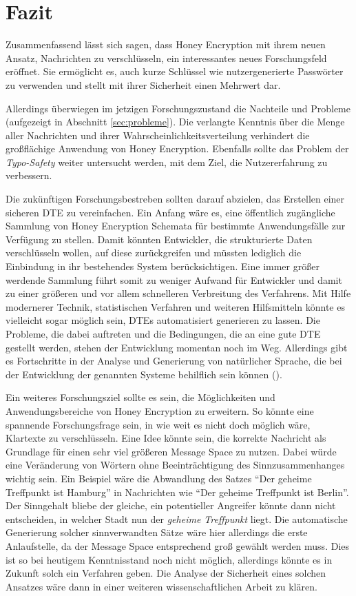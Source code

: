 \section{Fazit}
\label{sec:fazit}
Zusammenfassend lässt sich sagen, dass Honey Encryption mit ihrem neuen Ansatz, Nachrichten zu verschlüsseln, ein interessantes neues Forschungsfeld eröffnet. Sie ermöglicht es, auch kurze Schlüssel wie nutzergenerierte Passwörter zu verwenden und stellt mit ihrer Sicherheit einen Mehrwert dar.

Allerdings überwiegen im jetzigen Forschungszustand die Nachteile und Probleme (aufgezeigt in Abschnitt \ref{sec:probleme}). Die verlangte Kenntnis über die Menge aller Nachrichten und ihrer Wahrscheinlichkeitsverteilung verhindert die großflächige Anwendung von Honey Encryption. Ebenfalls sollte das Problem der \emph{Typo-Safety} weiter untersucht werden, mit dem Ziel, die Nutzererfahrung zu verbessern.

Die zukünftigen Forschungsbestreben sollten darauf abzielen, das Erstellen einer sicheren DTE zu vereinfachen. Ein Anfang wäre es, eine öffentlich zugängliche Sammlung von Honey Encryption Schemata für bestimmte Anwendungsfälle zur Verfügung zu stellen. Damit könnten Entwickler, die strukturierte Daten verschlüsseln wollen, auf diese zurückgreifen und müssten lediglich die Einbindung in ihr bestehendes System berücksichtigen. Eine immer größer werdende Sammlung führt somit zu weniger Aufwand für Entwickler und damit zu einer größeren und vor allem schnelleren Verbreitung des Verfahrens. Mit Hilfe modernerer Technik, statistischen Verfahren und weiteren Hilfsmitteln könnte es vielleicht sogar möglich sein, DTEs automatisiert generieren zu lassen. Die Probleme, die dabei auftreten und die Bedingungen, die an eine gute DTE gestellt werden, stehen der Entwicklung momentan noch im Weg. Allerdings gibt es Fortschritte in der Analyse und Generierung von natürlicher Sprache, die bei der Entwicklung der genannten Systeme behilflich sein können (\cite{CRCS2014}).

Ein weiteres Forschungsziel sollte es sein, die Möglichkeiten und Anwendungsbereiche von Honey Encryption zu erweitern. So könnte eine spannende Forschungsfrage sein, in wie weit es nicht doch möglich wäre, Klartexte zu verschlüsseln. Eine Idee könnte sein, die korrekte Nachricht als Grundlage für einen sehr viel größeren Message Space zu nutzen. Dabei würde eine Veränderung von Wörtern ohne Beeinträchtigung des Sinnzusammenhanges wichtig sein. Ein Beispiel wäre die Abwandlung des Satzes ``Der geheime Treffpunkt ist Hamburg'' in Nachrichten wie ``Der geheime Treffpunkt ist Berlin''. Der Sinngehalt bliebe der gleiche, ein potentieller Angreifer könnte dann nicht entscheiden, in welcher Stadt nun der \emph{geheime Treffpunkt} liegt. Die automatische Generierung solcher sinnverwandten Sätze wäre hier allerdings die erste Anlaufstelle, da der Message Space entsprechend groß gewählt werden muss. Dies ist so bei heutigem Kenntnisstand noch nicht möglich, allerdings könnte es in Zukunft solch ein Verfahren geben. Die Analyse der Sicherheit eines solchen Ansatzes wäre dann in einer weiteren wissenschaftlichen Arbeit zu klären.

